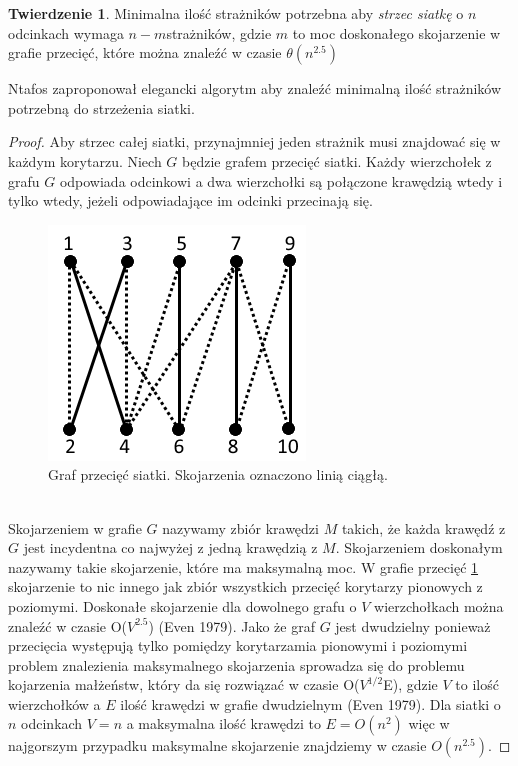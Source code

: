 \documentclass[brudnopis]{xmgr}
\theoremstyle{definition}
\newtheorem{Twierdzenie}{Twierdzenie}
\begin{document}
\begin{Twierdzenie}\cite{ntafos}
	Minimalna ilość strażników potrzebna aby \emph{strzec siatkę} o $n$ odcinkach wymaga $n - m$strażników, gdzie $m$ to moc doskonałego skojarzenie w grafie przecięć, które można znaleźć w czasie $\theta(n^{2.5})$
\end{Twierdzenie}
Ntafos zaproponował elegancki algorytm aby znaleźć minimalną ilość strażników potrzebną do strzeżenia siatki.
\begin{proof}
Aby strzec całej siatki, przynajmniej jeden strażnik musi znajdować się w każdym korytarzu. Niech $G$ będzie grafem przecięć siatki. Każdy wierzchołek z grafu $G$ odpowiada odcinkowi a dwa wierzchołki są połączone krawędzią wtedy i tylko wtedy, jeżeli odpowiadające im odcinki przecinają się.
 \begin{figure}[ht!]
   \centering
   \label{fig:graf przeciec}
   \includegraphics{rysunki/graf_skojarzen.png}
   \caption{Graf przecięć siatki. Skojarzenia oznaczono linią ciągłą.}
 \end{figure} 
 \\Skojarzeniem w grafie $G$ nazywamy zbiór krawędzi $M$ takich, że każda krawędź z $G$ jest incydentna co najwyżej z jedną krawędzią z $M$. Skojarzeniem doskonałym nazywamy takie skojarzenie, które ma maksymalną moc. W grafie przecięć \ref{fig:graf przeciec} skojarzenie to nic innego jak zbiór wszystkich przecięć korytarzy pionowych z poziomymi. Doskonałe skojarzenie dla dowolnego grafu o $V$ wierzchołkach można znaleźć w czasie O($V^{2.5}$) (Even 1979). Jako że graf $G$ jest dwudzielny ponieważ przecięcia występują tylko pomiędzy korytarzamia pionowymi i poziomymi problem znalezienia maksymalnego skojarzenia sprowadza się do problemu kojarzenia małżeństw, który da się rozwiązać w czasie O($V^{1/2}$E), gdzie $V$ to ilość wierzchołków a $E$ ilość krawędzi w grafie dwudzielnym (Even 1979). Dla siatki o $n$ odcinkach $V = n$ a maksymalna ilość krawędzi to $E = O(n^2)$ więc w najgorszym przypadku maksymalne skojarzenie znajdziemy w czasie $O(n^{2.5})$.

\end{proof}
\end{document}
